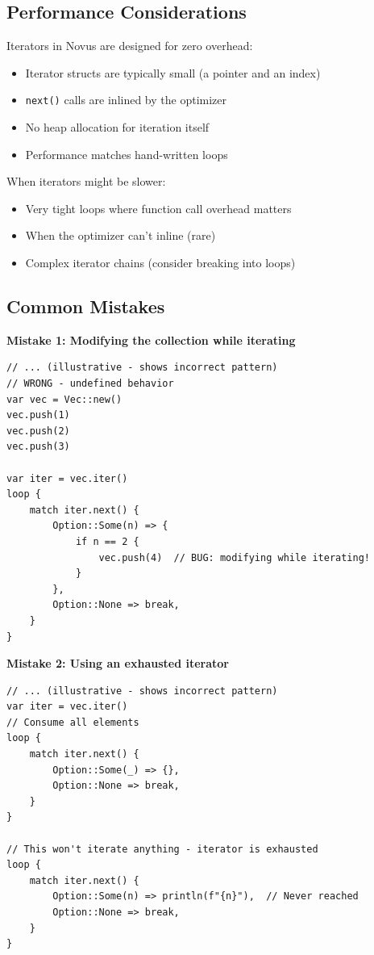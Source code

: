 \subsection{Performance Considerations}

Iterators in Novus are designed for zero overhead:

\begin{itemize}
    \item Iterator structs are typically small (a pointer and an index)
    \item \texttt{next()} calls are inlined by the optimizer
    \item No heap allocation for iteration itself
    \item Performance matches hand-written loops
\end{itemize}

When iterators might be slower:
\begin{itemize}
    \item Very tight loops where function call overhead matters
    \item When the optimizer can't inline (rare)
    \item Complex iterator chains (consider breaking into loops)
\end{itemize}

\subsection{Common Mistakes}

\textbf{Mistake 1: Modifying the collection while iterating}

\begin{lstlisting}
// ... (illustrative - shows incorrect pattern)
// WRONG - undefined behavior
var vec = Vec::new()
vec.push(1)
vec.push(2)
vec.push(3)

var iter = vec.iter()
loop {
    match iter.next() {
        Option::Some(n) => {
            if n == 2 {
                vec.push(4)  // BUG: modifying while iterating!
            }
        },
        Option::None => break,
    }
}
\end{lstlisting}

\textbf{Mistake 2: Using an exhausted iterator}

\begin{lstlisting}
// ... (illustrative - shows incorrect pattern)
var iter = vec.iter()
// Consume all elements
loop {
    match iter.next() {
        Option::Some(_) => {},
        Option::None => break,
    }
}

// This won't iterate anything - iterator is exhausted
loop {
    match iter.next() {
        Option::Some(n) => println(f"{n}"),  // Never reached
        Option::None => break,
    }
}
\end{lstlisting}


